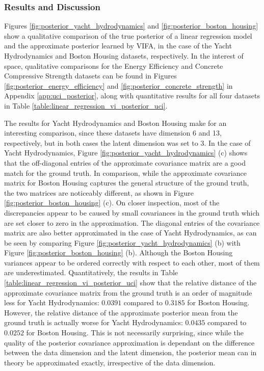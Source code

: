 \documentclass[msc,deptreport.inf]{infthesis} %
\begin{document}
\subsubsection{Results and Discussion}

Figures \ref{fig:posterior_yacht_hydrodynamics} and \ref{fig:posterior_boston_housing} show a qualitative comparison of the true posterior of a linear regression model and the approximate posterior learned by VIFA, in the case of the Yacht Hydrodynamics and Boston Housing datasets, respectively. In the interest of space, qualitative comparisons for the Energy Efficiency and Concrete Compressive Strength datasets can be found in Figures \ref{fig:posterior_energy_efficiency} and \ref{fig:posterior_concrete_strength} in Appendix \ref{app:uci_posterior}, along with quantitative results for all four datasets in Table \ref{table:linear_regression_vi_posterior_uci}.

The results for Yacht Hydrodynamics and Boston Housing make for an interesting comparison, since these datasets have dimension 6 and 13, respectively, but in both cases the latent dimension was set to 3. In the case of Yacht Hydrodynamics, Figure \ref{fig:posterior_yacht_hydrodynamics} (c) shows that the off-diagonal entries of the approximate covariance matrix are a good match for  the ground truth. In comparison, while the approximate covariance matrix for Boston Housing captures the general structure of the ground truth, the two matrices are noticeably different, as shown in Figure \ref{fig:posterior_boston_housing} (c). On closer inspection, most of the discrepancies appear to be caused by small covariances in the ground truth which are set closer to zero in the approximation. The diagonal entries of the covariance matrix are also better approximated in the case of Yacht Hydrodynamics, as can be seen by comparing Figure \ref{fig:posterior_yacht_hydrodynamics} (b) with Figure \ref{fig:posterior_boston_housing} (b). Although the Boston Housing variances appear to be ordered correctly with respect to each other, most of them are underestimated. Quantitatively, the results in Table \ref{table:linear_regression_vi_posterior_uci} show that the relative distance of the approximate covariance matrix from the ground truth is an order of magnitude less for Yacht Hydrodynamics: $0.0391$ compared to $0.3185$ for Boston Housing. However, the relative distance of the approximate posterior mean from the ground truth is actually worse for Yacht Hydrodynamics: $0.0435$ compared to $0.0252$ for Boston Housing. This is not necessarily surprising, since while the quality of the posterior covariance approximation is dependant on the difference between the data dimension and the latent dimension, the posterior mean can in theory be approximated exactly, irrespective of the data dimension. 
\end{document}

